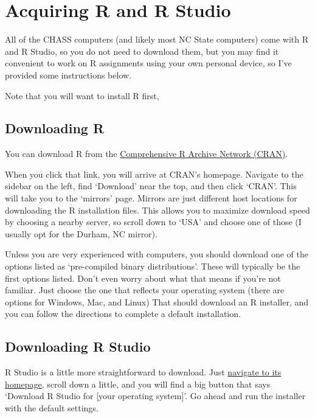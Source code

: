 \documentclass[
  letterpaper,
  DIV=11,
  numbers=noendperiod]{scrreprt}
\begin{document}
\section{Acquiring R and R Studio}\label{acquiring-r-and-r-studio}

All of the CHASS computers (and likely most NC State computers) come
with R and R Studio, so you do not need to download them, but you may
find it convenient to work on R assignments using your own personal
device, so I've provided some instructions below.

Note that you will want to install R first,

\subsection{Downloading R}\label{downloading-r}

You can download R from the
\href{https://www.r-project.org/}{Comprehensive R Archive Network
(CRAN)}.

When you click that link, you will arrive at CRAN's homepage. Navigate
to the sidebar on the left, find `Download' near the top, and then click
`CRAN'. This will take you to the `mirrors' page. Mirrors are just
different host locations for downloading the R installation files. This
allows you to maximize download speed by choosing a nearby server, so
scroll down to `USA' and choose one of those (I usually opt for the
Durham, NC mirror).

Unless you are very experienced with computers, you should download one
of the options listed as `pre-compiled binary distributions'. These will
typically be the first options listed. Don't even worry about what that
means if you're not familiar. Just choose the one that reflects your
operating system (there are options for Windows, Mac, and Linux) That
should download an R installer, and you can follow the directions to
complete a default installation.

\subsection{Downloading R Studio}\label{downloading-r-studio}

R Studio is a little more straightforward to download. Just
\href{https://posit.co/download/rstudio-desktop/}{navigate to its
homepage}, scroll down a little, and you will find a big button that
says `Download R Studio for {[}your operating system{]}'. Go ahead and
run the installer with the default settings.
\end{document}
